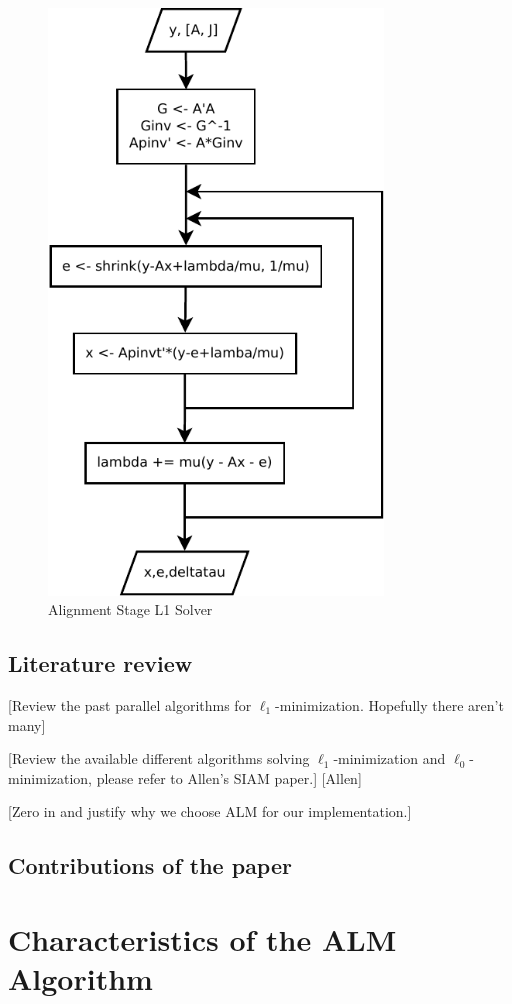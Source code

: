 \documentclass[10pt,twocolumn,letterpaper]{article}
\begin{document}
\begin{figure}
\centering
\includegraphics[width=3.5in]{figures/alignment_l1.pdf}
\caption{Alignment Stage L1 Solver}
\label{fig:alignment_l1}
\end{figure}

\subsection{Literature review}
[Review the past parallel algorithms for $\ell_1$-minimization. Hopefully there aren't many]

[Review the available different algorithms solving $\ell_1$-minimization and $\ell_0$-minimization, please refer to Allen's SIAM paper.]
[Allen]

[Zero in and justify why we choose ALM for our implementation.]

\subsection{Contributions of the paper}

\section{Characteristics of the ALM Algorithm}
\end{document}
